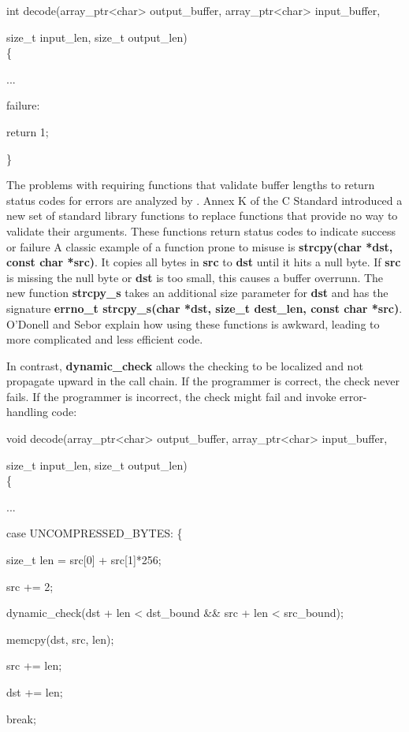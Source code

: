 \documentclass[]{article}
\begin{document}
int decode(array\_ptr\textless{}char\textgreater{} output\_buffer,
array\_ptr\textless{}char\textgreater{} input\_buffer,

size\_t input\_len, size\_t output\_len)\\
\{

...

failure:

return 1;

\}

The problems with requiring functions that validate buffer lengths to
return status codes for errors are analyzed by . Annex K of the C
Standard introduced a new set of standard library functions to replace
functions that provide no way to validate their arguments. These
functions return status codes to indicate success or failure A classic
example of a function prone to misuse is \textbf{strcpy(char *dst, const
char *src)}. It copies all bytes in \textbf{src} to \textbf{dst} until
it hits a null byte. If \textbf{src} is missing the null byte or
\textbf{dst} is too small, this causes a buffer overrunn. The new
function \textbf{strcpy\_s} takes an additional size parameter for
\textbf{dst} and has the signature \textbf{errno\_t strcpy\_s(char *dst,
size\_t dest\_len, const char *src)}. O'Donell and Sebor explain how
using these functions is awkward, leading to more complicated and less
efficient code.

In contrast, \textbf{dynamic\_check} allows the checking to be localized
and not propagate upward in the call chain. If the programmer is
correct, the check never fails. If the programmer is incorrect, the
check might fail and invoke error-handling code:

void decode(array\_ptr\textless{}char\textgreater{} output\_buffer,
array\_ptr\textless{}char\textgreater{} input\_buffer,

size\_t input\_len, size\_t output\_len)\\
\{

...

case UNCOMPRESSED\_BYTES: \{

size\_t len = src{[}0{]} + src{[}1{]}*256;

src += 2;

dynamic\_check(dst + len \textless{} dst\_bound \&\& src + len
\textless{} src\_bound);

memcpy(dst, src, len);

src += len;

dst += len;

break;
\end{document}

